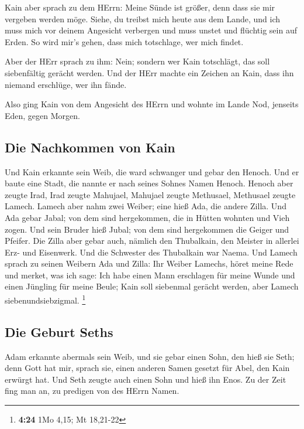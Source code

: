  Kain aber sprach zu dem HErrn: Meine Sünde ist größer,
denn dass sie mir vergeben werden möge.  Siehe, du
treibst mich heute aus dem Lande, und ich muss mich vor deinem Angesicht
verbergen und muss unstet und flüchtig sein auf Erden. So wird mir's
gehen, dass mich totschlage, wer mich findet.

 Aber der HErr sprach zu ihm: Nein; sondern wer Kain
totschlägt, das soll siebenfältig gerächt werden. Und der HErr machte
ein Zeichen an Kain, dass ihn niemand erschlüge, wer ihn fände.

 Also ging Kain von dem Angesicht des HErrn und wohnte im
Lande Nod, jenseits Eden, gegen Morgen.

\hypertarget{die-nachkommen-von-kain}{%
\subsection{Die Nachkommen von Kain}\label{die-nachkommen-von-kain}}

 Und Kain erkannte sein Weib, die ward schwanger und
gebar den Henoch. Und er baute eine Stadt, die nannte er nach seines
Sohnes Namen Henoch.  Henoch aber zeugte Irad, Irad
zeugte Mahujael, Mahujael zeugte Methusael, Methusael zeugte Lamech.
 Lamech aber nahm zwei Weiber; eine hieß Ada, die andere
Zilla.  Und Ada gebar Jabal; von dem sind hergekommen,
die in Hütten wohnten und Vieh zogen.  Und sein Bruder
hieß Jubal; von dem sind hergekommen die Geiger und Pfeifer.
 Die Zilla aber gebar auch, nämlich den Thubalkain, den
Meister in allerlei Erz- und Eisenwerk. Und die Schwester des Thubalkain
war Naema.  Und Lamech sprach zu seinen Weibern Ada und
Zilla: Ihr Weiber Lamechs, höret meine Rede und merket, was ich sage:
Ich habe einen Mann erschlagen für meine Wunde und einen Jüngling für
meine Beule;  Kain soll siebenmal gerächt werden, aber
Lamech siebenundsiebzigmal. \footnote{\textbf{4:24} 1Mo 4,15; Mt
  18,21-22}

\hypertarget{die-geburt-seths}{%
\subsection{Die Geburt Seths}\label{die-geburt-seths}}

 Adam erkannte abermals sein Weib, und sie gebar einen
Sohn, den hieß sie Seth; denn Gott hat mir, sprach sie, einen anderen
Samen gesetzt für Abel, den Kain erwürgt hat.  Und Seth
zeugte auch einen Sohn und hieß ihn Enos. Zu der Zeit fing man an, zu
predigen von des HErrn Namen.

